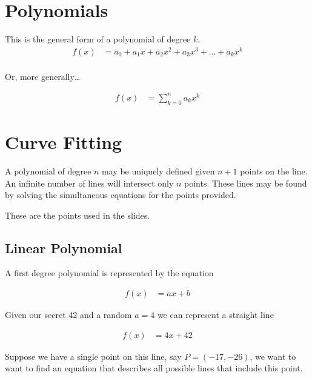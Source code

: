 \documentclass[preview,border=3mm]{article}
\begin{document}

\section{Polynomials}
\noindent
This is the general form of a polynomial of degree $k$.
\begin{align*}
    f(x) &= a_0 + a_1x + a_2x^2 + a_3x^3 + \ldots + a_kx^k\\
\end{align*}

\noindent
Or, more generally\dots

\begin{align*}
    f(x) &= \sum\limits_{k=0}^n a_kx^k
\end{align*}


\section{Curve Fitting}
\noindent
A polynomial of degree $n$ may be uniquely defined given $n+1$ points on the
line. An infinite number of lines will intersect only $n$ points. These lines
may be found by solving the simultaneous equations for the points provided.

\noindent
These are the points used in the slides.

\subsection{Linear Polynomial}

\noindent
A first degree polynomial is represented by the equation

\begin{align*}
    f(x) &= ax + b
\end{align*}

\noindent
Given our secret 42 and a random $a = 4$ we can represent a straight line

\begin{align}
    f(x) &= 4x + 42 \label{eq1}
\end{align}

\noindent
Suppose we have a single point on this line, say $P = (-17, -26)$, we want to
want to find an equation that describes all possible lines that include this
point.
\end{document}

